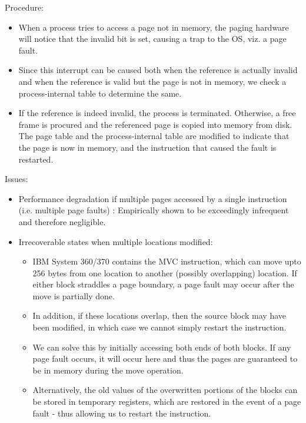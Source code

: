 \documentclass{amsart}
\begin{document}
    Procedure:
    \begin{itemize}
        \item 
        When a process tries to access a page not in memory, the paging hardware will notice that the invalid bit is set, causing a trap to the OS, viz. a page fault.
        
        \item 
        Since this interrupt can be caused both when the reference is actually invalid and when the reference is valid but the page is not in  memory, we check a process-internal table to determine the same.
        
        \item
        If the reference is indeed invalid, the process is terminated. Otherwise, a free frame is procured and the referenced page is copied into memory from disk. The page table and the process-internal table are modified to indicate that the page is now in memory, and the instruction that caused the fault is restarted.
    \end{itemize}

    Issues:
    \begin{itemize}
        \item Performance degradation if multiple pages accessed by a single instruction (i.e. multiple page faults) : Empirically shown to be exceedingly infrequent and therefore negligible.
        \item Irrecoverable states when multiple locations modified: \begin{itemize}
            \item IBM System 360/370 contains the MVC instruction, which can move upto 256 bytes from one location to another (possibly overlapping) location. If either block straddles a page boundary, a page fault may occur after the move is partially done.
            \item In addition, if these locations overlap, then the source block may have been modified, in which case we cannot simply restart the instruction.
            \item We can solve this by initially accessing both ends of both blocks. If any page fault occurs, it will occur here and thus the pages are guaranteed to be in memory during the move operation.
            \item Alternatively, the old values of the overwritten portions of the blocks can be stored in temporary registers, which are restored in the event of a page fault - thus allowing us to restart the instruction.
        \end{itemize}
    \end{itemize}
\end{document}
